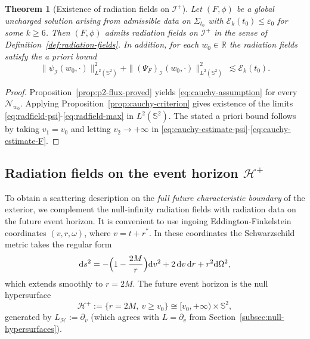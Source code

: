 \documentclass[11pt]{article}
\numberwithin{equation}{section}
\theoremstyle{plain}
\newtheorem{theorem}{Theorem}[section]
\theoremstyle{definition}
\theoremstyle{remark}
\newcommand{\dd}{\mathrm{d}}
\begin{document}
\begin{theorem}[Existence of radiation fields on $\mathcal{I}^+$]\label{thm:radiation-fields}
Let $(F,\phi)$ be a global uncharged solution arising from admissible data on $\Sigma_{t_0}$ with $\mathcal{E}_k(t_0)\le \varepsilon_0$ for some $k\ge 6$.
Then $(F,\phi)$ admits radiation fields on $\mathcal{I}^+$ in the sense of Definition~\ref{def:radiation-fields}.
In addition, for each $w_0\in\mathbb{R}$ the radiation fields satisfy the a priori bound
\begin{equation}
\|\psi_{\mathcal{I}}(w_0,\cdot)\|_{L^2(\mathbb{S}^2)}^2
+
\|(\Psi_F)_{\mathcal{I}}(w_0,\cdot)\|_{L^2(\mathbb{S}^2)}^2
\ \lesssim
\mathcal{E}_k(t_0).
\end{equation}
\end{theorem}

\begin{proof}
Proposition~\ref{prop:p2-flux-proved} yields \eqref{eq:cauchy-assumption} for every $\mathcal{N}_{w_0}$.
Applying Proposition~\ref{prop:cauchy-criterion} gives existence of the limits \eqref{eq:radfield-psi}-\eqref{eq:radfield-max} in $L^2(\mathbb{S}^2)$.
The stated a priori bound follows by taking $v_1=v_0$ and letting $v_2\to+\infty$ in \eqref{eq:cauchy-estimate-psi}-\eqref{eq:cauchy-estimate-F}.
\end{proof}


\subsection{Radiation fields on the event horizon \texorpdfstring{$\mathcal{H}^+$}{H+}}
\label{subsec:horizon-radiation}

To obtain a scattering description on the \emph{full future characteristic boundary} of the exterior,
we complement the null-infinity radiation fields with radiation data on the future event horizon.
It is convenient to use ingoing Eddington-Finkelstein coordinates $(v,r,\omega)$, where $v=t+r^\ast$.
In these coordinates the Schwarzschild metric takes the regular form
\begin{equation}
\dd s^{2}= -\Bigl(1-\frac{2M}{r}\Bigr)\dd v^{2}+2\,\dd v\,\dd r+r^{2}\dd\Omega^{2},
\end{equation}
which extends smoothly to $r=2M$.
The future event horizon is the null hypersurface
\begin{equation}
\mathcal{H}^{+}:=\{r=2M,\ v\ge v_0\}\cong [v_0,+\infty)\times \mathbb{S}^{2},
\end{equation}
generated by $L_{\mathcal H}:=\partial_v$ (which agrees with $L=\partial_v$ from Section~\ref{subsec:null-hypersurfaces}).
\end{document}
